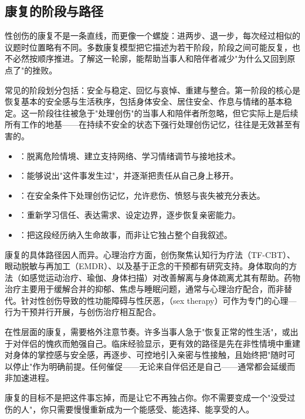\subsection{康复的阶段与路径}

性创伤的康复不是一条直线，而更像一个螺旋：进两步、退一步，每次经过相似的议题时位置略有不同。多数康复模型把它描述为若干阶段，阶段之间可能反复，也不必然按顺序推进。了解这一轮廓，能帮助当事人和陪伴者减少"为什么又回到原点了"的挫败。

常见的阶段划分包括：安全与稳定、回忆与哀悼、重建与整合。第一阶段的核心是恢复基本的安全感与生活秩序，包括身体安全、居住安全、作息与情绪的基本稳定。这一阶段往往被急于"处理创伤"的当事人和陪伴者所忽略，但它实际上是后续所有工作的地基——在持续不安全的状态下强行处理创伤记忆，往往是无效甚至有害的。

\begin{itemize}
  \item {}：脱离危险情境、建立支持网络、学习情绪调节与接地技术。
  \item {}：能够说出"这件事发生过"，并逐渐把责任从自己身上移开。
  \item {}：在安全条件下处理创伤记忆，允许悲伤、愤怒与丧失被充分表达。
  \item {}：重新学习信任、表达需求、设定边界，逐步恢复亲密能力。
  \item {}：把这段经历纳入生命故事，而非让它独占整个自我叙述。
\end{itemize}

康复的具体路径因人而异。心理治疗方面，创伤聚焦认知行为疗法（TF-CBT）、眼动脱敏与再加工（EMDR）、以及基于正念的干预都有研究支持。身体取向的方法（如感觉运动治疗、瑜伽、身体扫描）对改善解离与身体疏离尤其有帮助。药物治疗主要用于缓解合并的抑郁、焦虑与睡眠问题，通常与心理治疗配合，而非替代。针对性创伤导致的性功能障碍与性厌恶，（sex therapy）可作为专门的心理—行为干预并行开展，与创伤治疗相互配合。

在性层面的康复，需要格外注意节奏。许多当事人急于"恢复正常的性生活"，或出于对伴侣的愧疚而勉强自己。临床经验显示，更有效的路径是先在非性情境中重建对身体的掌控感与安全感，再逐步、可控地引入亲密与性接触，且始终把"随时可以停止"作为明确前提。任何催促——无论来自伴侣还是自己——通常都会延缓而非加速进程。

\begin{tcolorbox}[colback=pink!5!white,colframe=red!50!black,title=贴心小叮咛]
康复的目标不是把这件事忘掉，而是让它不再独占你。你不需要变成一个"没受过伤的人"，你只需要慢慢重新成为一个能感受、能选择、能享受的人。
\end{tcolorbox}

